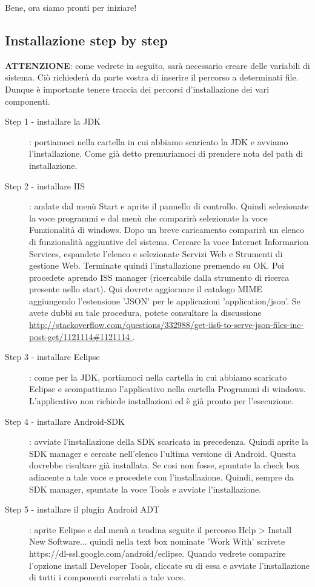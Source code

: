 \documentclass[10pt,a4paper,onecolumn]{article}
\begin{document}
Bene, ora siamo pronti per iniziare!

\subsection{Installazione step by step}

\textbf{ATTENZIONE}: come vedrete in seguito, sarà necessario creare delle variabili di sistema. Ciò richiederà da parte vostra di inserire il percorso a determinati file. Dunque è importante tenere traccia dei percorsi d'installazione dei vari componenti.

\begin{description}
	\item[Step 1 - installare la JDK]: portiamoci nella cartella in cui abbiamo scaricato la JDK e avviamo l'installazione. Come già detto premuriamoci di prendere nota del path di installazione.
	\item[Step 2 - installare IIS]: andate dal menù Start e aprite il pannello di controllo. Quindi selezionate la voce programmi e dal menù che comparirà selezionate la voce Funzionalità di windows. Dopo un breve caricamento comparirà un elenco di funzionalità aggiuntive del sistema. Cercare la voce Internet Informarion Services, espandete l'elenco e selezionate Servizi Web e Strumenti di gestione Web. Terminate quindi l'installazione premendo su OK. Poi procedete aprendo ISS manager (ricercabile dalla strumento di ricerca presente nello start). Qui dovrete aggiornare il catalogo MIME aggiungendo l'estensione 'JSON' per le applicazioni 'application/json'. Se avete dubbi su tale procedura, potete consultare la discussione \url{http://stackoverflow.com/questions/332988/get-iis6-to-serve-json-files-inc-post-get/1121114#1121114 }.
	\item[Step 3 - installare Eclipse]: come per la JDK, portiamoci nella cartella in cui abbiamo scaricato Eclipse e scompattiamo l'applicativo nella cartella Programmi di windows. L'applicativo non richiede installazioni ed è già pronto per l'esecuzione.
	\item[Step 4 - installare Android-SDK]: avviate l'installazione della SDK scaricata in precedenza. Quindi aprite la SDK manager e cercate nell'elenco l'ultima versione di Android. Questa dovrebbe risultare già installata. Se cosi non fosse, spuntate la check box adiacente a tale voce e procedete con l'installazione. Quindi, sempre da SDK manager, spuntate la voce Tools e avviate l'installazione.
	\item[Step 5 - installare il plugin Android ADT]: aprite Eclipse e dal menù a tendina seguite il percorso Help > Install New Software... quindi nella text box nominate 'Work With' scrivete https://dl-ssl.google.com/android/eclipse. Quando vedrete comparire l'opzione install Developer Tools, cliccate su di essa e avviate l'installazione di tutti i componenti correlati a tale voce.

\end{description}
\end{document}
